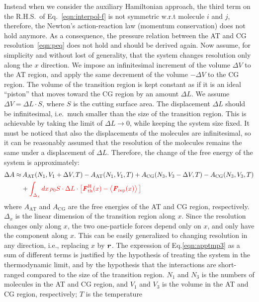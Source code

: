 \documentclass[a4paper,preprint,unsortedaddress]{revtex4-1}
\newcommand{\recheck}[1]{{\color{red} #1}}
\newcommand{\vect}[1]{\textbf{\textit{#1}}}
\newcommand{\AT}{{\textrm{{AT}}}}
\newcommand{\CG}{{\textrm{CG}}}
\newcommand{\thf}{{\textrm{th}}}
\newcommand{\res}{{\textrm{rep}}}
\newcommand{\hadress}{{\textrm{H}}}
\begin{document}
{Instead when we consider the auxiliary Hamiltonian approach, the third term on the R.H.S.~of Eq.~\eqref{eqn:interpol-f} is not
symmetric w.r.t molecule $i$ and $j$, therefore, the Newton's
action-reaction law (momentum conservation) does not hold anymore.
As a consequence, the pressure relation between the AT and CG
resolution~\eqref{eqn:peq} does not hold and should be derived again.
Now assume, {for simplicity and without lost of generality}, that the system changes resolution only along the $x$ direction.
We impose an infinitesimal increment of the volume $\Delta V$ to the
AT region, and apply the same decrement of the volume $-\Delta V$ to the CG
region.  The volume of the transition region is kept constant as if it is an ideal ``piston'' that moves toward the CG region by an amount $\Delta L$.
We assume $\Delta V = \Delta L\cdot S$, where $S$ is the
cutting surface area.
The displacement $\Delta L$ should be infinitesimal, i.e.~much smaller than the size of the
transition region. This is achievable by taking the limit of $\Delta L\rightarrow 0$,
while keeping the system size fixed.
It must be noticed that also the displacements of the molecules are infinitesimal, so it can be reasonably assumed that
the resolution of the molecules remains the same under a displacement of $\Delta L$.
Therefore, the change of the free energy of the system is approximately:
\begin{align}\nonumber
  \Delta A \approx&\,
  A_\AT(N_1, V_1+\Delta V, T) -
  A_\AT(N_1, V_1, T)
  +
  A_\CG(N_3, V_3-\Delta V, T) -
  A_\CG(N_3, V_3, T)\\\label{eqn:apptmp3}
  &+
  \recheck{\int_{\Delta_{x}} d x\, \rho_0 S\cdot \Delta L\cdot
  \big[\vect F^\hadress_\thf(x)
  -
  \big\langle \vect F_\res(x)\big\rangle\,\big]}
\end{align}
where $A_\AT$ and $A_\CG$ are the free energies of the AT and CG region, respectively.
\recheck{
$\Delta_{x}$ is the linear dimension of the transition region along $x$. 
Since the resolution changes only along $x$,
the two one-particle forces depend only on $x$, and only have the component along $x$.
This can be easily generalized to changing resolution in any direction, i.e., replacing $x$ by ${\vect r}$.}
The expression of Eq.\ref{eqn:apptmp3} as a sum of different terms is justified by the hypothesis of treating the system in the thermodynamic limit, and by the hypothesis that the interactions are short-ranged compared to the size of the transition region.
$N_1$ and $N_3$ is the numbers of molecules in the AT and CG region, and
$V_1$ and $V_3$ is the volume in the AT and CG region, respectively; $T$ is the temperature
}
\end{document}

